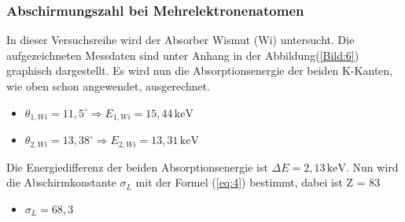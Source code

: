 \subsubsection{Abschirmungszahl bei Mehrelektronenatomen}
In dieser Versuchsreihe wird der Absorber Wismut (Wi) untersucht.
Die aufgezeichneten Messdaten sind unter Anhang in der Abbildung(\ref{Bild:6}) graphisch dargestellt.
Es wird nun die Absorptionsenergie der beiden K-Kanten, wie oben schon angewendet, ausgerechnet.
\begin{itemize}
  \item $\theta_{1,Wi} = 11,5^\circ \Rightarrow E_{1,Wi} = 15,44 \,\text{keV}$
  \item $\theta_{2,Wi} = 13,38^\circ \Rightarrow E_{2,Wi} = 13,31 \,\text{keV}$
\end{itemize}
Die Energiedifferenz der beiden Absorptionsenergie ist $\Delta E = 2,13 \,\text{keV}$.
Nun wird die Abschirmkonstante $\sigma_L$ mit der Formel (\ref{eq:4}) bestimmt, dabei ist Z = 83
\begin{itemize}
  \item $\sigma_L = 68,3 $
\end{itemize}
